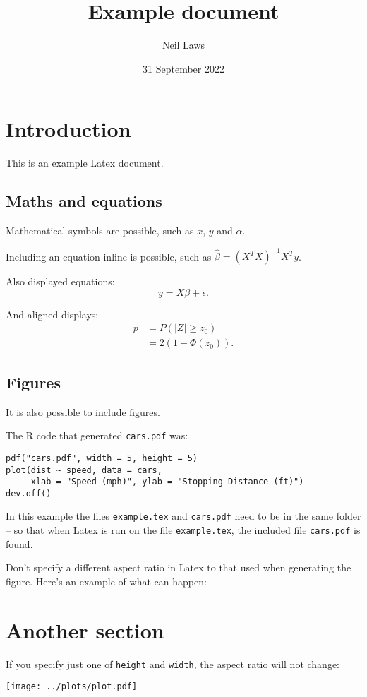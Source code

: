 \documentclass[a4paper,11pt]{article}
\title{Example document}
\author{Neil Laws}
\date{31 September 2022}
\begin{document}
\maketitle

\section{Introduction}

This is an example Latex document.

\subsection{Maths and equations}

Mathematical symbols are possible, such as $x$, $y$ and $\alpha$.

Including an equation inline is possible, such as $\widehat{\beta} = (X^T X)^{-1}X^T y$.

Also displayed equations:
\begin{equation}
	y = X\beta + \epsilon.
\end{equation}

And aligned displays:
\begin{align*}
	p &= P(|Z| \geq z_0)\\
	  &= 2(1 - \Phi(z_0)).
\end{align*}

\subsection{Figures}

It is also possible to include figures.



The R code that generated \texttt{cars.pdf} was:
\begin{verbatim}
pdf("cars.pdf", width = 5, height = 5)
plot(dist ~ speed, data = cars,
     xlab = "Speed (mph)", ylab = "Stopping Distance (ft)")
dev.off()
\end{verbatim}

In this example the files \texttt{example.tex} and \texttt{cars.pdf} need to be in the same folder -- so that when Latex is run on the file \texttt{example.tex}, the included file \texttt{cars.pdf} is found.

Don't specify a different aspect ratio in Latex to that used when generating the figure. Here's an example of what can happen:



\section{Another section}

If you specify just one of \texttt{height} and \texttt{width}, the aspect ratio will not change:

\texttt{[image: ../plots/plot.pdf]}
\end{document}
